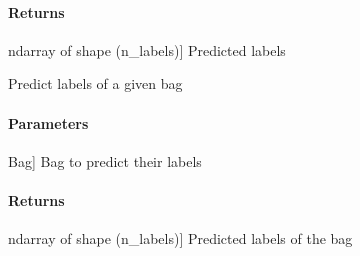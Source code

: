 \documentclass[letterpaper,10pt,english]{sphinxmanual}
\begin{document}
\begin{fulllineitems}
\begin{fulllineitems}
\begin{description}
\end{description}


\paragraph{Returns}
\label{\detokenize{classifier/mimlTOmi/_autosummary/miml.classifier.mimlTOmi.miml_to_mi_br_classifier.MIMLtoMIBRClassifier:id4}}\begin{description}
\sphinxlineitem{results}{[}ndarray of shape (n\_labels){]}
\sphinxAtStartPar
Predicted labels

\end{description}

\end{fulllineitems}


\begin{fulllineitems}
\label{\detokenize{classifier/mimlTOmi/_autosummary/miml.classifier.mimlTOmi.miml_to_mi_br_classifier.MIMLtoMIBRClassifier:miml.classifier.mimlTOmi.miml_to_mi_br_classifier.MIMLtoMIBRClassifier.predict_bag}}
\pysigstartsignatures
{}
\pysigstopsignatures
\sphinxAtStartPar
Predict labels of a given bag


\paragraph{Parameters}
\label{\detokenize{classifier/mimlTOmi/_autosummary/miml.classifier.mimlTOmi.miml_to_mi_br_classifier.MIMLtoMIBRClassifier:id5}}\begin{description}
\sphinxlineitem{bag}{[}Bag{]}
\sphinxAtStartPar
Bag to predict their labels

\end{description}


\paragraph{Returns}
\label{\detokenize{classifier/mimlTOmi/_autosummary/miml.classifier.mimlTOmi.miml_to_mi_br_classifier.MIMLtoMIBRClassifier:id6}}\begin{description}
\sphinxlineitem{results}{[}ndarray of shape (n\_labels){]}
\sphinxAtStartPar
Predicted labels of the bag


\end{description}
\end{fulllineitems}
\end{fulllineitems}
\end{document}
